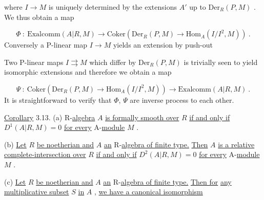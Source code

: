 \begin{center}
\end{center}
where  $I \to M$  is uniquely determined by the extensions  $A'$  up to  $\mathrm{Der}_R(P, M)$  . We thus obtain a map

\begin{equation*}
\Phi \ : \ \mathrm{Exalcomm}(A|R, M) \to \mathrm{Coker}(\mathrm{Der}_R(P, M) \to \mathrm{Hom}_A(I/I^2, M))  \ .
\end{equation*}
Conversely a P-linear map  $I \to M$  yields an extension by push-out

\begin{center}
\end{center}
Two P-linear maps  $I \rightrightarrows M$  which differ by  $\mathrm{Der}_R(P, M)$  is trivially seen to yield isomorphic extensions and therefore we obtain a map

\begin{equation*}
\Psi \ : \ \mathrm{Coker}(\mathrm{Der}_R(P, M) \to \mathrm{Hom}_A(I/I^2, M)) \to \mathrm{Exalcomm}(A|R, M)  \ .
\end{equation*}
It is straightforward to verify that  $\Phi$, $\Psi$  are inverse process to each other.

\underline{Corollary} 3.13.  (a)  R-\underline{algebra}  $A$  \underline{is formally smooth over}  $R$  \underline{if and only if} $D^1(A|R, M) = 0$  \underline{for every} A-\underline{module}  $M$  .

(b)  \underline{Let}  $R$  \underline{be noetherian and}  $A$  \underline{an} R-\underline{algebra of finite type.} \underline{Then}  $A$ \underline{is a relative complete-intersection over}  $R$  \underline{if and only if}  $D^2(A|R, M) = 0$  \underline{for every} A-\underline{module}  $M$  .

(c)  \underline{Let}  $R$  \underline{be noetherian and}  $A$  \underline{an} R-\underline{algebra of finite type.} \underline{Then for} \underline{any multiplicative subset}  $S$  \underline{in}  $A$  , \underline{we have a canonical isomorphism}

